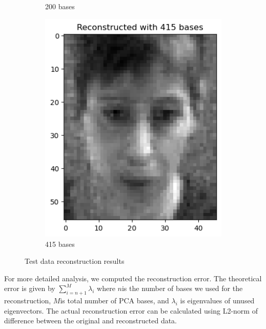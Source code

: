 \begin{figure}
\begin{subfigure}[t]{0.2\linewidth}
		\caption{200 bases}
		\label{fig:test_re_200}
	\end{subfigure}
    \hfill
	\begin{subfigure}[t]{0.2\linewidth}
		\centering
		\includegraphics[width=\linewidth]{image/q1_recon_test_415.png}
		\caption{415 bases}
		\label{fig:test_re_415}
	\end{subfigure}
	\caption{Test data reconstruction results}
	\label{fig:recon_test}
\end{figure}

For more detailed analysis, we computed the reconstruction error. The theoretical error is given by $\sum_{i=n+1}^M \lambda_i$ where $n$is the number of bases we used for the reconstruction, $M$is total number of PCA bases, and $\lambda_i$ is eigenvalues of unused eigenvectors. The actual reconstruction error can be calculated using L2-norm of difference between the original and reconstructed data.

